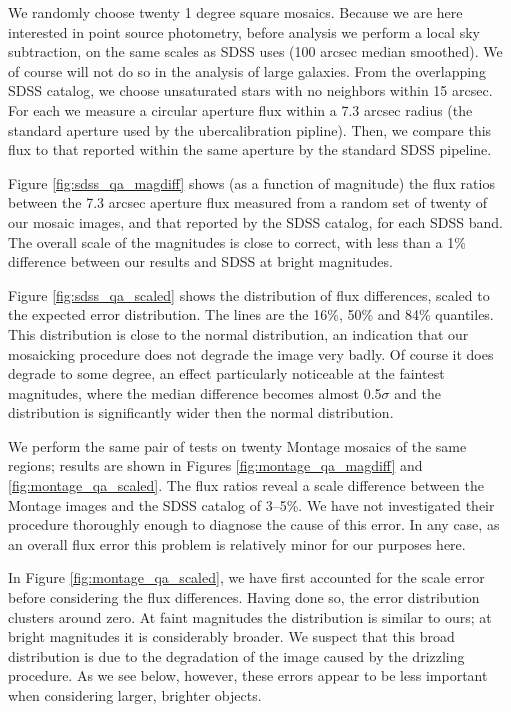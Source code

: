 \documentclass[10pt,preprint]{aastex}
\begin{document}
We randomly choose twenty 1 degree square mosaics. Because we are here
interested in point source photometry, before analysis we perform a
local sky subtraction, on the same scales as SDSS uses (100 arcsec
median smoothed).  We of course will not do so in the analysis of
large galaxies. From the overlapping SDSS catalog, we choose
unsaturated stars with no neighbors within 15 arcsec.  For each we
measure a circular aperture flux within a 7.3 arcsec radius (the
standard aperture used by the ubercalibration pipline).  Then, we
compare this flux to that reported within the same aperture by the
standard SDSS pipeline.

Figure \ref{fig:sdss_qa_magdiff} shows (as a function of magnitude)
the flux ratios between the 7.3 arcsec aperture flux measured from a
random set of twenty of our mosaic images, and that reported by the
SDSS catalog, for each SDSS band. The overall scale of the magnitudes
is close to correct, with less than a 1\% difference between our
results and SDSS at bright magnitudes.

Figure \ref{fig:sdss_qa_scaled} shows the distribution of flux
differences, scaled to the expected error distribution. The lines are
the 16\%, 50\% and 84\% quantiles. This distribution is close to the
normal distribution, an indication that our mosaicking procedure does
not degrade the image very badly.  Of course it does degrade to some
degree, an effect particularly noticeable at the faintest magnitudes,
where the median difference becomes almost 0.5$\sigma$ and the
distribution is significantly wider then the normal distribution.

We perform the same pair of tests on twenty Montage mosaics of the
same regions; results are shown in Figures
\ref{fig:montage_qa_magdiff} and \ref{fig:montage_qa_scaled}.  The
flux ratios reveal a scale difference between the Montage
images and the SDSS catalog of 3--5\%.
We have not investigated their procedure thoroughly enough to diagnose
the cause of this error.  In any case, as an overall flux error this
problem is relatively minor for our purposes here.

In Figure \ref{fig:montage_qa_scaled}, we have first accounted for the
scale error before considering the flux differences. Having done so,
the error distribution clusters around zero.  At faint magnitudes the
distribution is similar to ours; at bright magnitudes it is
considerably broader. We suspect that this broad distribution is due
to the degradation of the image caused by the drizzling procedure. As
we see below, however, these errors appear to be less important when
considering larger, brighter objects. 
\end{document}
